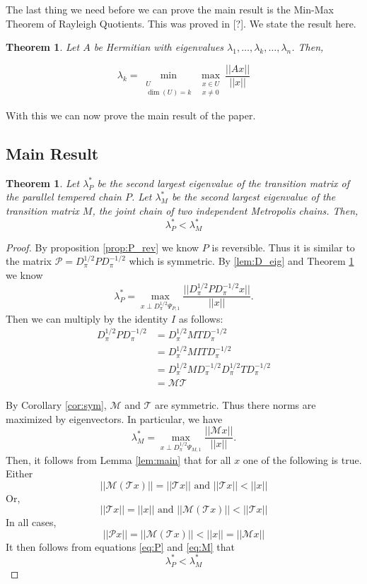 \documentclass{amsart}
\newtheorem{theorem}[definition]{Theorem}
\newcommand{\1}{\mathbbm{1}}
\newcommand{\D}{D_\pi^{1/2}}
\newcommand{\Dm}{D_\pi^{-1/2}}
\begin{document}
The last thing we need before we can prove the main result is the Min-Max Theorem of Rayleigh Quotients. This was proved in [?]. We state the result here.

\begin{theorem}\label{thm:ray}
    Let $A$ be Hermitian with eigenvalues $\lambda_1,\dots,\lambda_k,\dots,\lambda_n$. Then,

    \[\lambda_k=\min_{\substack{U\\\dim(U)=k}}\max_{\substack{x\in U\\x\neq 0}} \frac{||Ax||}{||x||}\]
\end{theorem}

With this we can now prove the main result of the paper.
\subsection{Main Result}

\begin{theorem}
    Let $\lambda^*_{P}$ be the second largest eigenvalue of the transition matrix of the parallel tempered chain $P$. Let $\lambda^*_{M}$ be the second largest eigenvalue of the transition matrix $M$, the joint chain of two independent Metropolis chains. Then,
    \[\lambda^*_{P}<\lambda^*_M\]
\end{theorem}

\begin{proof}
    By proposition \ref{prop:P_rev} we know $P$ is reversible. Thus it is similar to the matrix $\mathcal{P}=\D P\Dm$ which is symmetric. By \ref{lem:D_eig} and Theorem \ref{thm:ray} we know
    \begin{equation}\label{eq:P}
        \lambda^*_P=\max_{x\perp \D\Psi_{P,1}} \frac{||\D P\Dm x||}{||x||}.
    \end{equation}
    Then we can multiply by the identity $I$ as follows:
    \begin{align*}
        \D P\Dm &= \D MT \Dm\\
        &=\D MIT \Dm\\
        &=\D M\Dm \D T\Dm \\
        &=\mathcal{M}\mathcal{T}
    \end{align*}

    By Corollary \ref{cor:sym}, $\mathcal{M}$ and $\mathcal{T}$ are symmetric. Thus there norms are maximized by eigenvectors. In particular, we have
    \begin{equation}\label{eq:M}
        \lambda^*_M=\max_{x\perp \D\Psi_{M,1}} \frac{||\mathcal{M} x||}{||x||}.
    \end{equation}
    Then, it follows from Lemma \ref{lem:main} that for all $x$ one of the following is true. Either
    \[||\mathcal{M}(\mathcal{T} x)||=||\mathcal{T}x||\text{ and } ||\mathcal{T}x||<||x||\] 
    Or,
    \[||\mathcal{T} x||=||x|| \text{ and } ||\mathcal{M}(\mathcal{T} x)||<||\mathcal{T}x||\] 
    In all cases,
    \[||\mathcal{P}x||=||\mathcal{M}(\mathcal{T}x)||<||x||=||\mathcal{M} x||\]
    It then follows from equations \ref{eq:P} and \ref{eq:M} that
    \[\lambda^*_P<\lambda^*_M\]
\end{proof}
\end{document}
